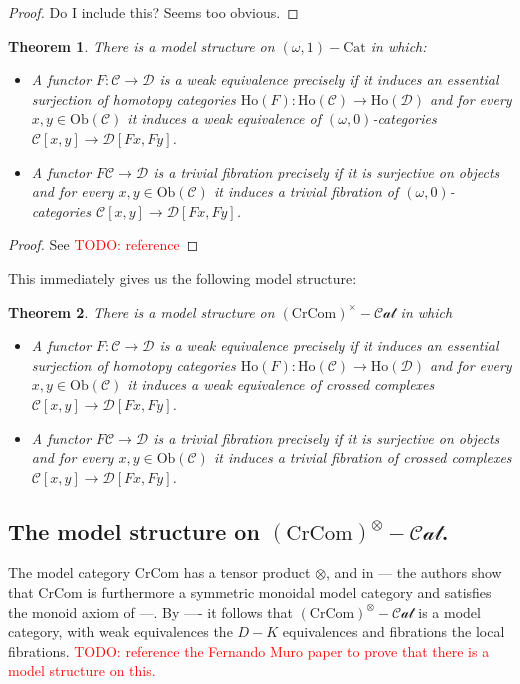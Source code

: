 \documentclass[12pt]{article}
\newtheorem{theorem}{Theorem}[section]
\theoremstyle{definition}
\newcommand{\TODO}[1]{\textcolor{red}{TODO: {#1}}}
\newcommand{\C}{\mathcal{C}}
\newcommand{\D}{\mathcal{D}}
\newcommand{\crcom}{\text{CrCom}}
\newcommand{\cartcrossedcat}{(\crcom)^\times-\mathcal{Cat}}
\newcommand{\tensorcrossedcat}{(\crcom)^\otimes-\mathcal{Cat}}
\begin{document}
		\begin{proof}
			Do I include this? Seems too obvious.
		\end{proof}
		\begin{theorem}
			There is a model structure on $(\omega,1)-\text{Cat}$ in which:
			\begin{itemize}
				\item A functor $F: \C \to \D$ is a weak equivalence precisely if it induces an essential surjection of homotopy categories $\text{Ho}(F) : \text{Ho}(\C) \to \text{Ho}(\D)$ and for every $x,y \in \text{Ob}(\C)$ it induces a weak equivalence of $(\omega,0)$-categories $\C[x,y] \to \D[Fx,Fy]$.
				\item A functor $F \C \to \D$ is a trivial fibration precisely if it is surjective on objects and for every $x,y \in \text{Ob}(\C)$ it induces a trivial fibration of $(\omega,0)$-categories $\C[x,y] \to \D[Fx,Fy]$. 
			\end{itemize}			 
		\end{theorem}
		\begin{proof}
			See \TODO{reference}
		\end{proof}
		This immediately gives us the following model structure:
		\begin{theorem}
			There is a model structure on $\cartcrossedcat$ in which
			\begin{itemize}
				\item A functor $F: \C \to \D$ is a weak equivalence precisely if it induces an essential surjection of homotopy categories $\text{Ho}(F) : \text{Ho}(\C) \to \text{Ho}(\D)$ and for every $x,y \in \text{Ob}(\C)$ it induces a weak equivalence of crossed complexes $\C[x,y] \to \D[Fx,Fy]$.
				\item A functor $F \C \to \D$ is a trivial fibration precisely if it is surjective on objects and for every $x,y \in \text{Ob}(\C)$ it induces a trivial fibration of crossed complexes $\C[x,y] \to \D[Fx,Fy]$. 
			\end{itemize}
		\end{theorem}
	\subsection{The model structure on $\tensorcrossedcat$.}
		The model category $\crcom$ has a tensor product $\otimes$, and in --- the authors show that $\crcom$ is furthermore a symmetric monoidal model category and satisfies the monoid axiom of ---. 
		By ---- it follows that $\tensorcrossedcat$ is a model category, with weak equivalences the $D-K$ equivalences and fibrations the local fibrations. 
		\TODO{reference the Fernando Muro paper to prove that there is a model structure on this.}
\end{document}
